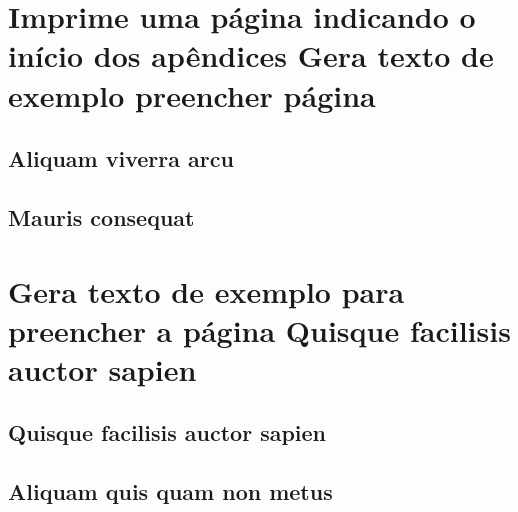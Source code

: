 \documentclass[
	12pt,				%
    oneside,            %
	a4paper,			%
	english,			%
	brazilian,		    %
	]{AcademicoUFT}
\begin{document}
\begin{apendicesenv}
\partapendices %

\chapter{Imprime uma página indicando o início dos apêndices Gera texto de exemplo preencher página}

\section{Aliquam viverra arcu}
\lipsum[8-9] %

\section{Mauris consequat}
\lipsum[24] %


\chapter{Gera texto de exemplo para preencher a página Quisque facilisis auctor sapien}

\section{Quisque facilisis auctor sapien}
\lipsum[80-81] %

\section{Aliquam quis quam non metus}
\lipsum[34] %

\end{apendicesenv}
\end{document}
